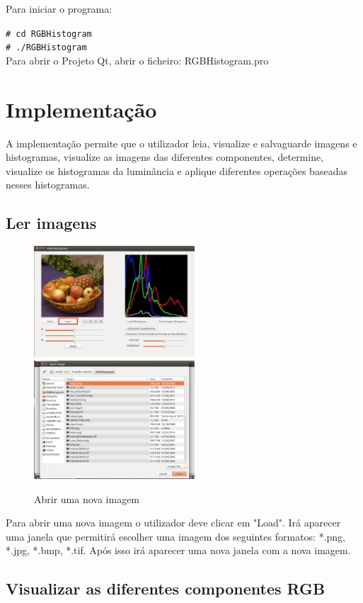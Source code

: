 \documentclass[pdftex,12pt,a4paper]{report}
\newcommand{\shellcmd}[1]{\indent\indent\texttt{\footnotesize\# #1}\\}
\begin{document}
Para iniciar o programa:

\shellcmd{cd RGBHistogram}
\shellcmd{./RGBHistogram}

Para abrir o Projeto Qt, abrir o ficheiro: RGBHistogram.pro

\section{Implementação}

A implementação permite que o utilizador leia, visualize e salvaguarde imagens e histogramas, visualize as imagens das diferentes componentes, determine, visualize os histogramas da luminância e aplique diferentes operações baseadas nesses histogramas.

\subsection{Ler imagens}

\begin{figure}[!htb]
\center
 \includegraphics[width=60mm,scale=1]{imagens/window_load.png}
 \includegraphics[width=60mm,scale=1]{imagens/window_open_image.png}
 \caption{Abrir uma nova imagem}
 \label{fig:open_book}
\end{figure}

Para abrir uma nova imagem o utilizador deve clicar em "Load". Irá aparecer uma janela que permitirá escolher uma imagem dos seguintes formatos: *.png, *.jpg, *.bmp, *.tif. Após isso irá aparecer uma nova janela com a nova imagem.

\newpage

\subsection{Visualizar as diferentes componentes RGB}
\end{document}
